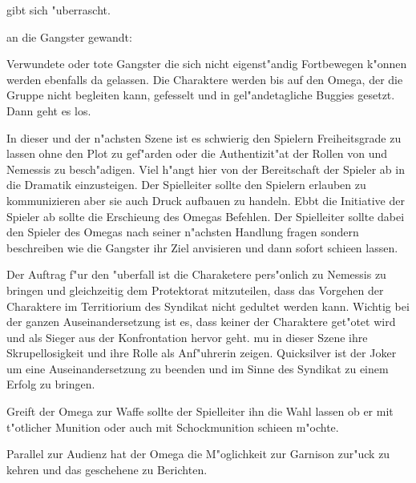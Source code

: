 
\xlsn{} gibt sich "uberrascht. 


\xlsn{} an die Gangster gewandt: 


Verwundete oder tote Gangster die sich nicht eigenst"andig Fortbewegen k"onnen werden ebenfalls da gelassen. Die Charaktere werden bis auf den Omega, der die Gruppe nicht begleiten kann, gefesselt und in gel"andetagliche Buggies gesetzt. Dann geht es los.

\begin{remarks}
	In dieser und der n"achsten Szene ist es schwierig den Spielern Freiheitsgrade zu lassen ohne den Plot zu gef"arden oder die Authentizit"at der Rollen von \xl{} und Nemessis zu besch"adigen. Viel h"angt hier von der Bereitschaft der Spieler ab in die Dramatik einzusteigen. Der Spielleiter sollte den Spielern erlauben zu kommunizieren aber sie auch Druck aufbauen zu handeln. Ebbt die Initiative der Spieler ab sollte \xl{} die Erschie\3ung des Omegas Befehlen. Der Spielleiter sollte dabei den Spieler des Omegas nach seiner n"achsten Handlung fragen sondern beschreiben wie die Gangster ihr Ziel anvisieren und dann sofort schie\3en lassen.

	Der Auftrag f"ur den "uberfall ist die Charaketere pers"onlich zu Nemessis zu bringen und gleichzeitig dem Protektorat mitzuteilen, dass das Vorgehen der Charaktere im Territiorium des Syndikat nicht gedultet werden kann. Wichtig bei der ganzen Auseinandersetzung ist es, dass keiner der Charaktere get"otet wird und \xl{} als Sieger aus der Konfrontation hervor geht. \xl{} mu\3 in dieser Szene ihre Skrupellosigkeit und ihre Rolle als Anf"uhrerin zeigen. Quicksilver ist der Joker um eine Auseinandersetzung zu beenden und im Sinne des Syndikat zu einem Erfolg zu bringen.

	Greift der Omega zur Waffe sollte der Spielleiter ihn die Wahl lassen ob er mit t"otlicher Munition oder auch mit Schockmunition schie\3en m"ochte.
\end{remarks}



Parallel zur Audienz hat der Omega die M"oglichkeit zur Garnison zur"uck zu kehren und das geschehene zu Berichten. 

